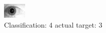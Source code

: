 \begin{figure}[h!]
\begin{center}
\includegraphics[width=0.60\columnwidth]{figures/ID1950_class_4_target_3.png}
\end{center}
\caption{ Classification: 4 actual target: 3}
\label{fig:ID1950_class_4_target_3}
\end{figure}
